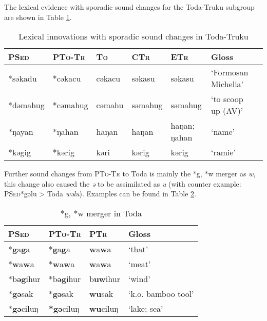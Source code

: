 \documentclass[12pt]{article}
\newcommand{\psed}{\textsc{PSed}\xspace}
\newcommand{\ptotr}{\textsc{PTo-Tr}\xspace}
\newcommand{\totrf}{Toda-Truku\xspace}
\newcommand{\sto}{\textsc{To}\xspace}
\newcommand{\stof}{Toda\xspace}
\newcommand{\ptr}{\textsc{PTr}\xspace}
\newcommand{\sctr}{\textsc{CTr}\xspace}
\newcommand{\setr}{\textsc{ETr}\xspace}
\begin{document}
The lexical evidence with sporadic sound changes for the \totrf subgroup are shown in Table \ref{tab:totrlex}.  


\begin{table}[!htbp]
\centering
\caption{Lexical innovations with sporadic sound changes in \totrf}
\label{tab:totrlex}
\begin{tabular}{lllllll}
\hline
\psed    & \ptotr   & \sto  & \sctr  & \setr       & Gloss                                                      \\ \hline
*səkadu  & *cəkacu  & cəkacu & səkasu  & səkasu       & `Formosan Michelia'  \\
*dəmahug & *cəmahug & cəmahu & səmahug & səmahug      & `to scoop up (AV)'   \\
*ŋayan   & *ŋahan   & haŋan  & haŋan   & haŋan; ŋahan & `name'                                               \\
*kəgig   & *kərig   & kəri   & kərig   & kərig        & `ramie'             \\ \hline          
\end{tabular}
\end{table}

Further sound changes from \ptotr to \stof is mainly the *g, *w merger as \textit{w}, this change also caused the \textit{ə} to be assimilated as \textit{u} (with counter example: \psed *gəlu > Toda \textit{wəlu}). Examples can be found in Table \ref{tab:todasc}.  

\begin{table}[!htbp]
\centering
\caption{*g, *w merger in Toda}
\label{tab:todasc}
\begin{tabular}{llll}
\hline
\psed    & \ptotr   & \ptr    & Gloss              \\ \hline
*\textbf{g}a\textbf{g}a    & *\textbf{g}a\textbf{g}a    & \textbf{w}a\textbf{w}a    & `that'             \\
*\textbf{w}a\textbf{w}a    & *\textbf{w}a\textbf{w}a    & \textbf{w}a\textbf{w}a    & `meat'             \\
*b\textbf{əg}ihur & *b\textbf{əg}ihur & b\textbf{uw}ihur & `wind'             \\
*\textbf{gə}sak   & *\textbf{gə}sak   & \textbf{wu}sak   & `k.o. bamboo tool' \\
*\textbf{gə}ciluŋ & \textbf{*gə}ciluŋ & \textbf{wu}ciluŋ & `lake; sea'        \\ \hline
\end{tabular}
\end{table}
\end{document}
